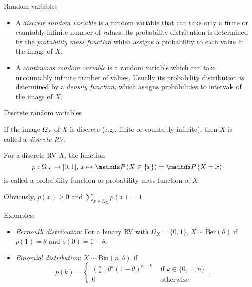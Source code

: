 \begin{vbframe}{Random variables}
\begin{itemize}
 	\item A \emph{discrete random variable} is a random variable that can take only a finite or countably
 	infinite number of values. Its probability distribution is determined by the \emph{probability mass function}  which assigns a probability to each value in the image of $X.$
 	\item A \emph{continuous random variable} is a random variable which can take uncountably
 	infinite number of values. Usually its probability distribution is determined by a \emph{density function,} which assigns probabilities to intervals of the image of $X.$
 \end{itemize}


\end{vbframe}



\begin{vbframe}{Discrete random variables} 

If the image $\Omega_X$ of $X$ is discrete (e.g., finite or countably infinite), then $X$ is called a \emph{discrete RV}.
 
 \lz
 
 For a discrete RV $X$, the function 
 $$p:\, \Omega_X \to [0,1], \,  x \mapsto  \P \left(X \in \{x\} \right) = \P \left(X = x \right)
 $$ 
 is called a probability function or probability mass function of $X$. 
 
 
 \lz 
 
 Obviously, $p(x) \geq 0$ and $\sum_{x \in \Omega_X} p(x) = 1$.
% 
 
	Examples:
	\begin{itemize}
		\item \emph{Bernoulli distribution}: For a binary RV with $\Omega_X = \{0,1\}$, $X \sim \mathrm{Ber}(\theta)$ if $p(1) = \theta$ and $p(0)= 1 - \theta$.
		\item \emph{Binomial distribution}: $X \sim \mathrm{Bin}(n,\theta)$ if $$
p(k) = \left\{ \begin{array}{cl}
	{n \choose k} \theta^k (1-\theta)^{n-k} & \text{ if } k \in \{0, \ldots , n\}\\
	0 & \text{ otherwise}
\end{array} \right. \, .
$$
	\end{itemize}
 


\end{vbframe}


